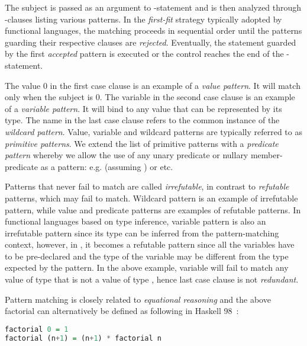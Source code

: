 \noindent
The subject  is passed as an argument to -statement and is 
then analyzed through -clauses listing various patterns. In the 
\emph{first-fit} strategy typically adopted by functional languages, the 
matching proceeds in sequential order until the patterns guarding their 
respective clauses are \emph{rejected}. Eventually, the statement guarded by the 
first \emph{accepted} pattern is executed or the control reaches the end of 
the -statement.

The value 0 in the first case clause is an example of a \emph{value pattern}. It 
will match only when the subject  is 0. The variable  in the 
second case clause is an example of a \emph{variable pattern}. It will bind to 
any value that can be represented by its type. The name \code{_} in the last 
case clause refers to the common instance of the \emph{wildcard pattern}. Value, 
variable and wildcard patterns are typically referred to as \emph{primitive 
patterns}. We extend the list of primitive patterns with a \emph{predicate 
pattern} whereby we allow the use of any unary predicate or nullary 
member-predicate as a pattern: e.g.  (assuming 
) or  etc.

Patterns that never fail to match are called \emph{irrefutable}, in contrast to 
\emph{refutable} patterns, which may fail to match. Wildcard pattern is an 
example of irrefutable pattern, while value and predicate patterns are examples 
of refutable patterns. In functional languages based on type inference, variable 
pattern is also an irrefutable pattern since its type can be inferred from the 
pattern-matching context, however, in \Cpp{}, it becomes a refutable pattern 
since all the variables have to be pre-declared and the type of the variable may 
be different from the type expected by the pattern. In the above example, 
variable  will fail to match any value of type  that is not a value
of type , hence last case clause is not \emph{redundant}.

Pattern matching is closely related to \emph{equational reasoning} and the above 
factorial can alternatively be defined as following in Haskell 98~\cite{Haskell98Book}:

\begin{lstlisting}[language=Haskell]
factorial 0 = 1
factorial (n+1) = (n+1) * factorial n
\end{lstlisting}

